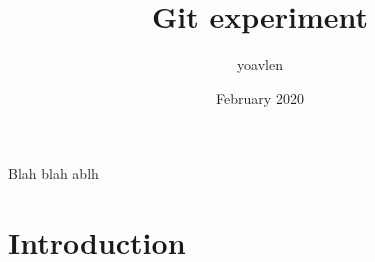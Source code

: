 \documentclass{article}
\title{Git experiment}
\author{yoavlen }
\date{February 2020}
\begin{document}
Blah blah ablh


\maketitle

\section{Introduction}
\end{document}
